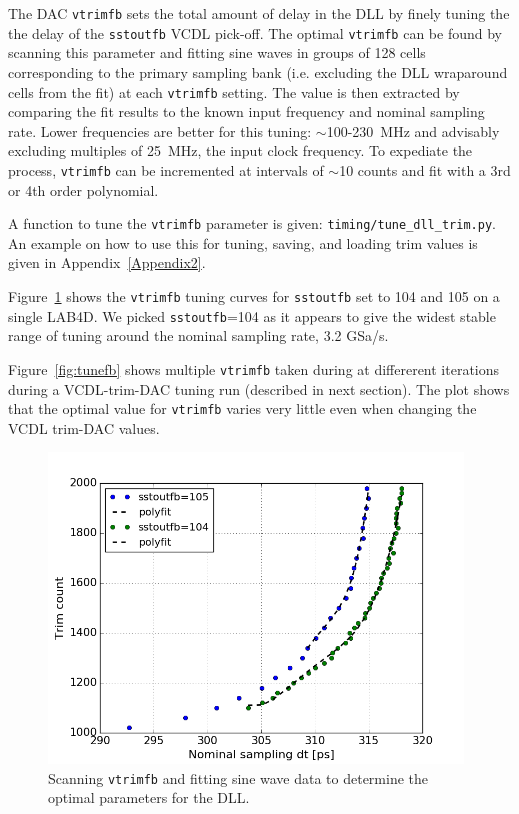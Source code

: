 \documentclass[11pt]{article}
\begin{document}
The DAC \verb!vtrimfb! sets the total amount of delay in the DLL by finely tuning the the delay of the \verb!sstoutfb! VCDL pick-off.
The optimal \verb!vtrimfb! can be found by scanning this parameter and fitting sine waves in groups of 128 cells corresponding to the primary sampling bank (i.e. excluding the DLL wraparound cells from the fit) at each \verb!vtrimfb! setting. The value is then extracted by comparing the fit results to the known input frequency and nominal sampling rate. Lower frequencies are better for this tuning: $\sim$100-230~MHz and advisably excluding multiples of 25~MHz, the input clock frequency.
To expediate the process, \verb!vtrimfb! can be incremented at intervals of $\sim$10 counts and fit with a 3rd or 4th order polynomial.

A function to tune the \verb!vtrimfb! parameter is given: \verb!timing/tune_dll_trim.py!.
An example on how to use this for tuning, saving, and loading trim values is given in Appendix~\ref{Appendix2}.

Figure~\ref{fig:fbsstout} shows the \verb!vtrimfb! tuning curves for \verb!sstoutfb! set to 104 and 105 on a single LAB4D.
We picked \verb!sstoutfb!=104 as it appears to give the widest stable range of tuning around the nominal sampling rate, 3.2 GSa/s.

Figure~\ref{fig:tunefb} shows multiple \verb!vtrimfb! taken during at differerent iterations during a VCDL-trim-DAC tuning run (described in next section).
The plot shows that the optimal value for \verb!vtrimfb! varies very little even when changing the VCDL trim-DAC values. 

\begin{figure}[h!]
  \begin{center}
    \includegraphics[width=11cm]{fig/fitVtrimFB_v2.png}
  \end{center}
  \caption{Scanning \texttt{vtrimfb} and fitting sine wave data to determine the optimal parameters for the DLL.}
  \label{fig:fbsstout}
\end{figure}
\end{document}
